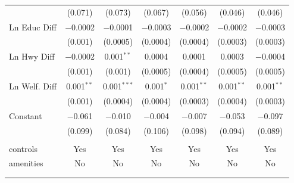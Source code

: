 \begin{table}[!htbp]
\begin{tabular}{@{\extracolsep{5pt}}lcccccc}
  & (0.071) & (0.073) & (0.067) & (0.056) & (0.046) & (0.046) \\ 
  Ln Educ Diff & $-$0.0002 & $-$0.0001 & $-$0.0003 & $-$0.0002 & $-$0.0002 & $-$0.0003 \\ 
  & (0.001) & (0.0005) & (0.0004) & (0.0004) & (0.0003) & (0.0003) \\ 
  Ln Hwy Diff & $-$0.0002 & 0.001$^{**}$ & 0.0004 & 0.0001 & 0.0003 & $-$0.0004 \\ 
  & (0.001) & (0.001) & (0.0005) & (0.0004) & (0.0005) & (0.0005) \\ 
  Ln Welf. Diff & 0.001$^{**}$ & 0.001$^{***}$ & 0.001$^{*}$ & 0.001$^{**}$ & 0.001$^{**}$ & 0.001$^{**}$ \\ 
  & (0.001) & (0.0004) & (0.0004) & (0.0003) & (0.0004) & (0.0003) \\ 
  Constant & $-$0.061 & $-$0.010 & $-$0.004 & $-$0.007 & $-$0.053 & $-$0.097 \\ 
  & (0.099) & (0.084) & (0.106) & (0.098) & (0.094) & (0.089) \\ 
 \hline \\[-1.8ex] 
controls & Yes & Yes & Yes & Yes & Yes & Yes \\ 
amenities & No & No & No & No & No & No \\ 
\hline \\[-1.8ex] 
\hline 
\hline \\[-1.8ex] 
\end{tabular} 
\end{table} 
